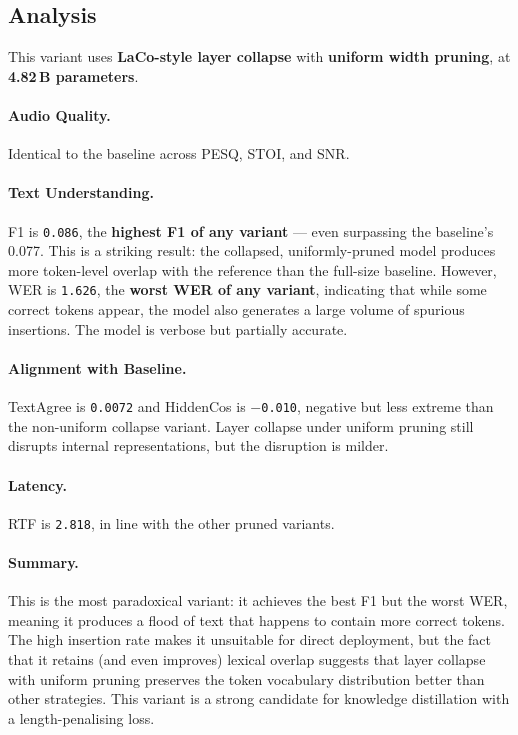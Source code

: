 \documentclass[11pt,a4paper]{article}
\newcommand{\scoreval}[1]{\texttt{#1}}
\begin{document}
\subsection{Analysis}

This variant uses \textbf{LaCo-style layer collapse} with \textbf{uniform width pruning}, at \textbf{4.82\,B parameters}.

\paragraph{Audio Quality.}
Identical to the baseline across PESQ, STOI, and SNR.

\paragraph{Text Understanding.}
F1 is \scoreval{0.086}, the \textbf{highest F1 of any variant} — even surpassing the baseline's 0.077. This is a striking result: the collapsed, uniformly-pruned model produces more token-level overlap with the reference than the full-size baseline. However, WER is \scoreval{1.626}, the \textbf{worst WER of any variant}, indicating that while some correct tokens appear, the model also generates a large volume of spurious insertions. The model is verbose but partially accurate.

\paragraph{Alignment with Baseline.}
TextAgree is \scoreval{0.0072} and HiddenCos is \scoreval{$-$0.010}, negative but less extreme than the non-uniform collapse variant. Layer collapse under uniform pruning still disrupts internal representations, but the disruption is milder.

\paragraph{Latency.}
RTF is \scoreval{2.818}, in line with the other pruned variants.

\paragraph{Summary.}
This is the most paradoxical variant: it achieves the best F1 but the worst WER, meaning it produces a flood of text that happens to contain more correct tokens. The high insertion rate makes it unsuitable for direct deployment, but the fact that it retains (and even improves) lexical overlap suggests that layer collapse with uniform pruning preserves the token vocabulary distribution better than other strategies. This variant is a strong candidate for knowledge distillation with a length-penalising loss.
\end{document}
